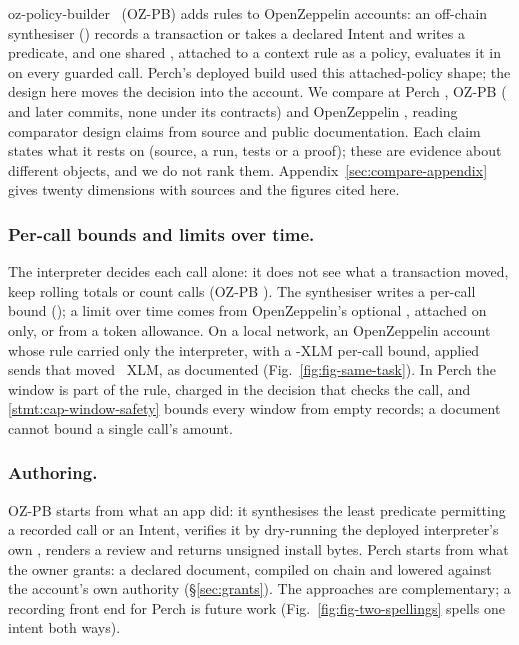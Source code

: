 oz-policy-builder~\cite{oz-policy-builder} (OZ-PB) adds rules to OpenZeppelin
accounts: an off-chain synthesiser () records a
transaction or takes a declared Intent and writes a predicate, and one shared
, attached to a context rule as a policy, evaluates it in
 on every guarded call. Perch's deployed build
 used this attached-policy shape; the design
here moves the decision into the account. We compare at Perch
, OZ-PB  ( and
 later commits, none under its contracts) and
OpenZeppelin , reading comparator design claims from source and
public documentation. Each claim states what it rests on (source, a run, tests or
a proof); these are evidence about different objects, and we do not rank them.
Appendix~\ref{sec:compare-appendix} gives twenty dimensions with sources and the
figures cited here.

\subsubsection{Per-call bounds and limits over time.}\label{sec:compare-over-time}
The interpreter decides each call alone: it does not see what a transaction
moved, keep rolling totals or count calls (OZ-PB ).
The synthesiser writes a per-call bound (); a limit over time comes
from OpenZeppelin's optional , attached on 
only, or from a token allowance. On a local network, an OpenZeppelin account whose
rule carried only the interpreter, with a -XLM
per-call bound, applied  sends that moved
~XLM, as documented (Fig.~\ref{fig:fig-same-task}).
In Perch the window is part of the rule, charged in the decision that checks the
call, and \ref{stmt:cap-window-safety} bounds every window from empty records; a
document cannot bound a single call's amount.

\subsubsection{Authoring.}\label{sec:compare-authoring} OZ-PB starts from what an
app did: it synthesises the least predicate permitting a recorded call or an
Intent, verifies it by dry-running the deployed interpreter's own ,
renders a review and returns unsigned install bytes. Perch starts from what the
owner grants: a declared document, compiled on chain and lowered against the
account's own authority (\S\ref{sec:grants}). The approaches are complementary;
a recording front end for Perch is future work (Fig.~\ref{fig:fig-two-spellings}
spells one intent both ways).

